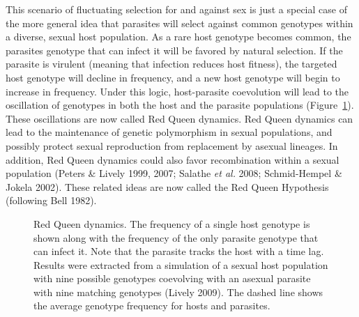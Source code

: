 \documentclass[
  letterpaper,
]{book}
\begin{document}
This scenario of fluctuating selection for and against sex is just a
special case of the more general idea that parasites will select against
common genotypes within a diverse, sexual host population. As a rare
host genotype becomes common, the parasites genotype that can infect it
will be favored by natural selection. If the parasite is virulent
(meaning that infection reduces host fitness), the targeted host
genotype will decline in frequency, and a new host genotype will begin
to increase in frequency. Under this logic, host-parasite coevolution
will lead to the oscillation of genotypes in both the host and the
parasite populations (Figure~\ref{fig-2-4}). These oscillations are now
called Red Queen dynamics. Red Queen dynamics can lead to the
maintenance of genetic polymorphism in sexual populations, and possibly
protect sexual reproduction from replacement by asexual lineages. In
addition, Red Queen dynamics could also favor recombination within a
sexual population (Peters \& Lively 1999, 2007; Salathe \emph{et al.}
2008; Schmid-Hempel \& Jokela 2002). These related ideas are now called
the Red Queen Hypothesis (following Bell 1982).

\begin{figure}


\caption[Red Queen dynamics]{\label{fig-2-4}Red Queen dynamics. The
frequency of a single host genotype is shown along with the frequency of
the only parasite genotype that can infect it. Note that the parasite
tracks the host with a time lag. Results were extracted from a
simulation of a sexual host population with nine possible genotypes
coevolving with an asexual parasite with nine matching genotypes (Lively
2009). The dashed line shows the average genotype frequency for hosts
and parasites.}

\end{figure}%
\end{document}
